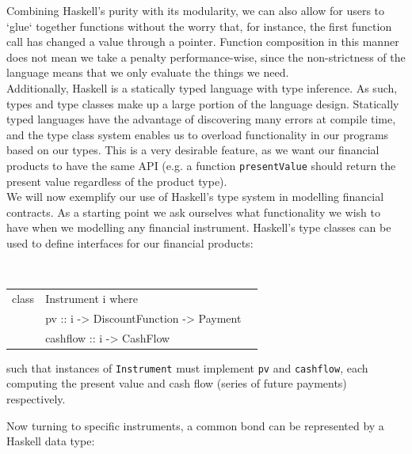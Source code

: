\documentclass[11pt]{article}
\begin{document}
Combining Haskell's purity with its modularity, we can also allow for users to `glue`
together functions without the worry that, for instance, the first function call has changed
a value through a pointer. Function composition in this manner does not mean we
take a penalty performance-wise, since the non-strictness of the language  means that
we only evaluate the things we need.\\

Additionally, Haskell is a statically typed language with type inference. As such, 
types and type classes make up a large portion of the language design. Statically typed languages have the
advantage of discovering many errors at compile time, and the type class system enables us to overload
functionality in our programs based on our types.
This is a very desirable feature, as we want our financial
products to have the same API (e.g. a function \texttt{presentValue} should return the
present value regardless of the product type).\\


We will now exemplify our use of Haskell's type system in modelling financial contracts.
As a starting point we ask ourselves what functionality we wish to have when we modelling
any financial instrument.
Haskell's type classes can be used to define interfaces for our financial products:

\begin{center}
\tt
\begin{tabular}{lll}
class & Instrument i where\\
      &\hspace{-1cm} pv       :: i -> DiscountFunction -> Payment\\
      &\hspace{-1cm} cashflow :: i -> CashFlow\\
\end{tabular}
\end{center}

such that instances of {\tt Instrument} must implement {\tt pv} and {\tt cashflow}, each
computing the present value and cash flow (series of future payments) respectively.

Now turning to specific instruments, a common bond can be represented by a
Haskell data type:
\end{document}
